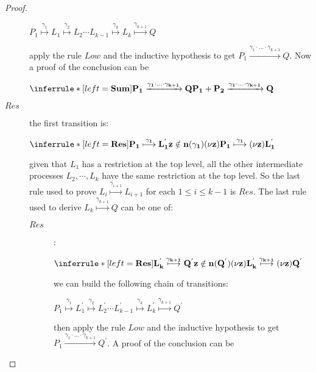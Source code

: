 \begin{proposition}
\begin{proof}
\begin{description}
		\begin{center}
		  $P_{1} \stackrel{\gamma_{1}}{\longmapsto} L_{1} \stackrel{\gamma_{2}}{\longmapsto} L_{2} \cdots L_{k-1} \stackrel{\gamma_{k}}{\longmapsto} L_{k} \stackrel{\gamma_{k+1}}{\longmapsto} Q$ 
		\end{center}
		apply the rule $Low$ and the inductive hypothesis to get $P_{1} \xrightarrow{\gamma_{1}\cdot \ldots \cdot \gamma_{k+1}} Q$. Now a proof of the conclusion can be
		\begin{center}
		  $\inferrule* [left=\bf{Sum}]{
		      P_{1} \xrightarrow{\gamma_{1}\cdot \ldots \cdot \gamma_{k+1}} Q
		    }{
		      P_{1}+P_{2} \xrightarrow{\gamma_{1}\cdot \ldots \cdot \gamma_{k+1}} Q
		  }$
		\end{center}
	      \item[$Res$] the first transition is:
		\begin{center}
		  $\inferrule* [left=\bf{Res}]{
			P_{1} \stackrel{\gamma_{1}}{\longmapsto} L_{1}^{'}
		      \\
			z\notin n(\gamma_{1})
		    }{
		      (\nu z) P_{1} \stackrel{\gamma_{1}}{\longmapsto} (\nu z)L_{1}^{'}
		  }$ 
		\end{center}
		given that $L_{1}$ has a restriction at the top level, all the other intermediate processes $L_{2}, \cdots, L_{k}$ have the same restriction at the top level. So the last rule used to prove $L_{i}\stackrel{\gamma_{i+1}}{\longmapsto} L_{i+1}$ for each $1\leq i \leq k-1$ is $Res$. The last rule used to derive $L_{k} \stackrel{\gamma_{k+1}}{\longmapsto} Q$ can be one of: 
		\begin{description}
		  \item[$Res$]:
		    \begin{center}
		      $\inferrule* [left=\bf{Res}]{
			  L_{k}^{'} \stackrel{\gamma_{k+1}}{\longmapsto} Q^{'}
			\\
			  z\notin n(Q^{'})
		      }{
			(\nu z)L_{k}^{'} \stackrel{\gamma_{k+1}}{\longmapsto} (\nu z)Q^{'}
		      }$
		    \end{center}
		    we can build the following chain of transitions:
		    \begin{center}
		      $P_{1} \stackrel{\gamma_{1}}{\longmapsto} L_{1}^{'} \stackrel{\gamma_{2}}{\longmapsto} L_{2}^{'} \cdots L_{k-1}^{'} \stackrel{\gamma_{k}}{\longmapsto} L_{k}^{'}\stackrel{\gamma_{k+1}}{\longmapsto} Q^{'}$ 
		    \end{center}
		    then apply the rule $Low$ and the inductive hypothesis to get $P_{1} \xrightarrow{\gamma_{1}\cdot \ldots \cdot \gamma_{k+1}} Q^{'}$. A proof of the conclusion can be

\end{description}
\end{description}
\end{proof}
\end{proposition}
